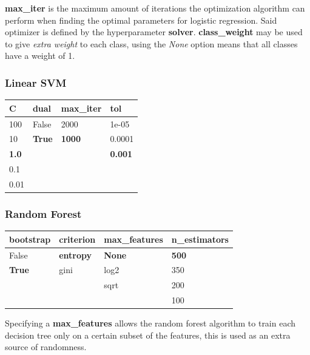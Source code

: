 \documentclass[epsfig,a4paper,11pt,titlepage,twoside,openany]{book}
\begin{document}
\textbf{max\_iter} is the maximum amount of iterations the optimization algorithm can perform when finding the optimal parameters for logistic regression. Said optimizer is defined by the hyperparameter \textbf{solver}. \textbf{class\_weight} may be used to give \textit{extra weight} to each class, using the \textit{None} option means that all classes have a weight of 1.


\subsubsection{Linear SVM}

\begin{table}[H]
\centering
\begin{tabular}{l|l|l|l}
C            & dual          & max\_iter     & tol            \\ \hline
100          & False         & 2000          & 1e-05          \\
10           & \textbf{True} & \textbf{1000} & 0.0001         \\
\textbf{1.0} &               &               & \textbf{0.001} \\
0.1          &               &               &                \\
0.01         &               &               & 
\end{tabular}
\end{table}


\subsubsection{Random Forest}

\begin{table}[H]
\centering
\begin{tabular}{l|l|l|l}
bootstrap     & criterion        & max\_features & n\_estimators \\ \hline
False         & \textbf{entropy} & \textbf{None} & \textbf{500}  \\
\textbf{True} & gini             & log2          & 350           \\
              &                  & sqrt          & 200           \\
              &                  &               & 100          
\end{tabular}
\end{table}

Specifying a \textbf{max\_features} allows the random forest algorithm to train each decision tree only on a certain subset of the features, this is used as an extra source of randomness.
\end{document}
